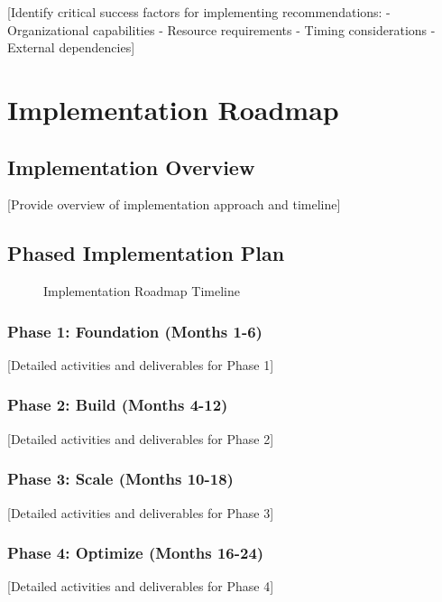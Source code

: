 \documentclass[11pt,letterpaper]{report}
\begin{document}
[Identify critical success factors for implementing recommendations:
- Organizational capabilities
- Resource requirements
- Timing considerations
- External dependencies]

\chapter{Implementation Roadmap}

\section{Implementation Overview}

[Provide overview of implementation approach and timeline]

\section{Phased Implementation Plan}


\begin{figure}[htbp]
\centering
\caption{Implementation Roadmap Timeline}
\label{fig:implementation}
\end{figure}

\subsection{Phase 1: Foundation (Months 1-6)}
[Detailed activities and deliverables for Phase 1]

\subsection{Phase 2: Build (Months 4-12)}
[Detailed activities and deliverables for Phase 2]

\subsection{Phase 3: Scale (Months 10-18)}
[Detailed activities and deliverables for Phase 3]

\subsection{Phase 4: Optimize (Months 16-24)}
[Detailed activities and deliverables for Phase 4]
\end{document}
